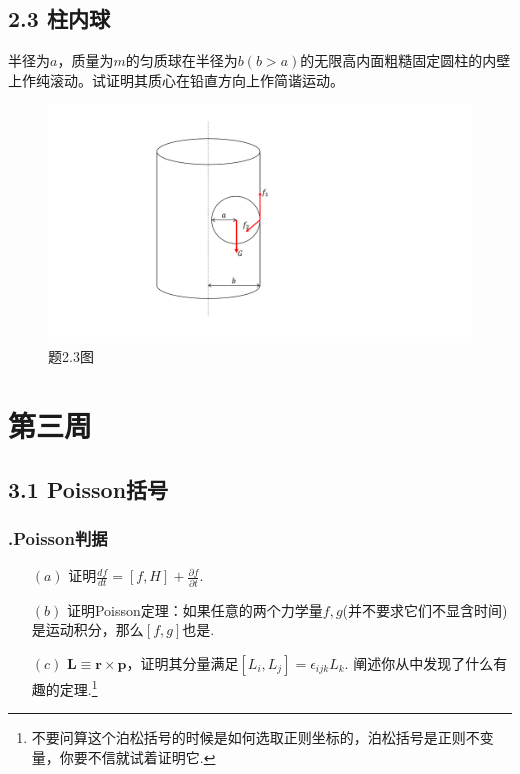 \documentclass[UTF8,fontset=windows,oneside]{ctexbook}
\begin{document}
\subsection*{2.3 柱内球}
半径为$a$，质量为$m$的匀质球在半径为$b(b>a)$的无限高内面粗糙固定圆柱的内壁上作纯滚动。试证明其质心在铅直方向上作简谐运动。
\begin{figure}[h]
    \centering
    \includegraphics[scale=0.4]{2-3.pdf}
    \caption{题2.3图}
    \label{fig:2}
\end{figure}


\section*{第三周}
\subsection*{3.1 Poisson括号}
\subsubsection{\uppercase\expandafter{}.Poisson判据}
\begin{itemize}
	\item[$(a)$] 证明$\frac{df}{dt}=[f,H]+\frac{\partial f}{\partial t}$.
	\item[$(b)$] 证明Poisson定理：如果任意的两个力学量$f,g$({\color{red}并不要求它们不显含时间})是运动积分，那么$[f,g]$也是.
	\item[$(c)$] $\mathbf{L}\equiv \mathbf{r}\times\mathbf{p}$，证明其分量满足$[L_i,L_j]=\epsilon_{ijk}L_k$. 阐述你从中发现了什么有趣的定理.\footnote{不要问算这个泊松括号的时候是如何选取正则坐标的，泊松括号是正则不变量，你要不信就试着证明它.}
\end{itemize}
\end{document}
